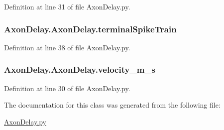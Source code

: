 Definition at line 31 of file Axon\-Delay.\-py.

\hypertarget{class_axon_delay_1_1_axon_delay_aba392d8938766355063cf4bf3a87962d}{
\subsubsection[{terminal\-Spike\-Train}]{\setlength{\rightskip}{0pt plus 5cm}Axon\-Delay.\-Axon\-Delay.\-terminal\-Spike\-Train}}\label{class_axon_delay_1_1_axon_delay_aba392d8938766355063cf4bf3a87962d}


Definition at line 38 of file Axon\-Delay.\-py.

\hypertarget{class_axon_delay_1_1_axon_delay_a59cc448f95b38b88b7103c3058e8c397}{
\subsubsection[{velocity\-\_\-m\-\_\-s}]{\setlength{\rightskip}{0pt plus 5cm}Axon\-Delay.\-Axon\-Delay.\-velocity\-\_\-m\-\_\-s}}\label{class_axon_delay_1_1_axon_delay_a59cc448f95b38b88b7103c3058e8c397}


Definition at line 30 of file Axon\-Delay.\-py.



The documentation for this class was generated from the following file\-:\begin{DoxyCompactItemize}
\item 
\hyperlink{_axon_delay_8py}{Axon\-Delay.\-py}\end{DoxyCompactItemize}
